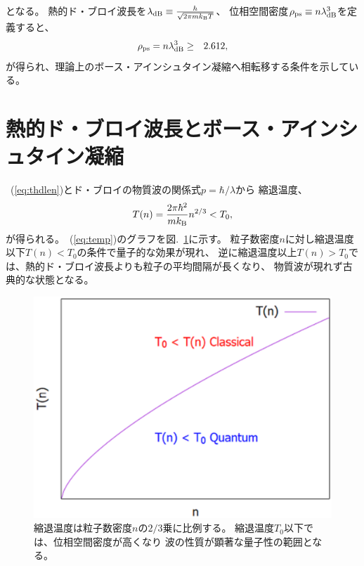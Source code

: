 \documentclass[12pt,a4paper]{jbook}
\newcommand{\kb} {k_{\rm B}}				%
\begin{document}
        	となる。
        	熱的ド・ブロイ波長を${\lambda_{{\rm dB}}} \equiv \frac{h}{\sqrt{2 \pi m \kb T}}$、
        	位相空間密度$\rho_{{\rm ps}} \equiv n \lambda_{{\rm dB}}^3$を定義すると、
		\begin{eqnarray}
            	\label{eq:thdlen}
			\rho_{{\rm ps}} = n \lambda_{{\rm dB}}^3 & \ge & 2.612,
		\end{eqnarray}
        	が得られ、理論上のボース・アインシュタイン凝縮へ相転移する条件を示している。


		\section{熱的ド・ブロイ波長とボース・アインシュタイン凝縮}
		~(\ref{eq:thdlen})とド・ブロイの物質波の関係式$p=\hbar/\lambda$から
		縮退温度、
		\begin{eqnarray}
            	\label{eq:temp}
			T(n) = \frac{2 \pi \hbar^2}{m k_{\rm B}}n^{2/3} < T_0,
		\end{eqnarray}
		が得られる。~(\ref{eq:temp})のグラフを図.~\ref{FIG:debroglie}に示す。
        	粒子数密度$n$に対し縮退温度以下$T(n)<T_0$の条件で量子的な効果が現れ、
		逆に縮退温度以上$T(n)>T_0$では、熱的ド・ブロイ波長よりも粒子の平均間隔が長くなり、
		物質波が現れず古典的な状態となる。
		\begin{figure}[H]
			\begin{center}
				\includegraphics[width=14cm]{debroglie.eps}
				\caption{
                    縮退温度は粒子数密度$n$の$2/3$乗に比例する。
					縮退温度$T_0$以下では、位相空間密度が高くなり
                    波の性質が顕著な量子性の範囲となる。
				}
				\label{FIG:debroglie}
			\end{center}
		\end{figure}
\end{document}
